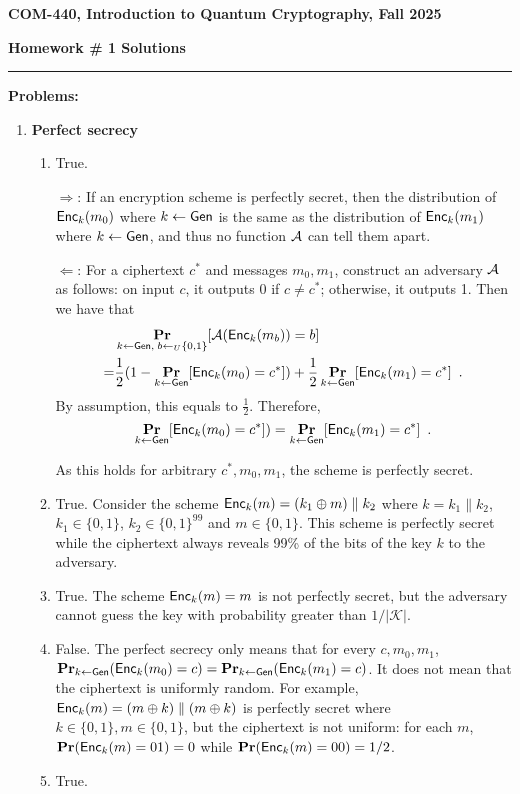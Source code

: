 \documentclass[12pt]{article}
\newcommand{\header}[1]{\begin{center} {\large\bf #1} \end{center}}
\begin{document}
\header{COM-440, Introduction to Quantum Cryptography, Fall 2025}
{\bf Homework \# 1 Solutions} 


\medskip

\hrule

 
\medskip
{\bf Problems:}

\begin{enumerate}

	
\item {\bf Perfect secrecy}
\begin{enumerate}
	\item True. 
	
	$\Rightarrow$: If an encryption scheme is perfectly secret, then the distribution of $\mathsf{Enc}_{k}(m_0)$ where $k \gets \mathsf{Gen}$ is the same as the distribution of $\mathsf{Enc}_{k}(m_1)$ where $k \gets \mathsf{Gen}$, and thus no function $\mathcal{A}$ can tell them apart.
	
	$\Leftarrow$: For a ciphertext $c^*$ and messages $m_0, m_1$, construct an adversary  $\mathcal{A}$ as follows: on input $c$, it outputs 0 if $c \ne c^*$; otherwise, it outputs 1. Then we have that
	\begin{align*}
	&\mathop{\bf Pr\/}_{k \gets \mathsf{Gen},\; b \gets_U \{0,1\}}[\mathcal{A}(\mathsf{Enc}_{k}(m_{b}))
    = b]\\
    =& \frac{1}{2}(1 - \mathop{\bf Pr\/}_{k \gets \mathsf{Gen}}[\mathsf{Enc}_{k}(m_{0}) = c^*]) + \frac{1}{2}\mathop{\bf Pr\/}_{k \gets \mathsf{Gen}}[\mathsf{Enc}_{k}(m_{1}) = c^*]\enspace.
	\end{align*}
	By assumption, this equals to $\frac{1}{2}$. Therefore,
	\[\mathop{\bf Pr\/}_{k \gets \mathsf{Gen}}[\mathsf{Enc}_{k}(m_{0}) = c^*]) = \mathop{\bf Pr\/}_{k \gets \mathsf{Gen}}[\mathsf{Enc}_{k}(m_{1}) = c^*]\enspace.\]
	
	As this holds for arbitrary $c^*, m_0, m_1$, the scheme is perfectly secret.
	\item True. Consider the scheme $\mathsf{Enc}_{k}(m) = (k_1 \oplus m) \parallel k_2$ where $k = k_1 \parallel k_2$, $k_1 \in \{0, 1\}$, $k_2 \in \{0, 1\}^{99}$ and $m \in \{0, 1\}$. This scheme is perfectly secret while the ciphertext always reveals 99\% of the bits of the key $k$ to the adversary.
	\item True. The scheme $\mathsf{Enc}_{k}(m) = m$ is not perfectly secret, but the adversary cannot guess the key with probability greater than $1/|\mathcal{K}|$.
	\item False. The perfect secrecy only means that for every $c, m_0, m_1$, $\mathop{\bf Pr\/}_{k \gets \mathsf{Gen}}(\mathsf{Enc}_{k}(m_0)= {c}) = \mathop{\bf Pr\/}_{k \gets \mathsf{Gen}}(\mathsf{Enc}_{k}(m_1)= {c})$. It does not mean that the ciphertext is uniformly random. For example, $\mathsf{Enc}_{k}(m) = (m \oplus k) \parallel (m \oplus k)$ is perfectly secret where $k \in \{0, 1\}, m \in \{0, 1\}$, but the ciphertext is not uniform: for each $m$, $\mathop{\bf Pr\/}(\mathsf{Enc}_{k}(m) = 01) = 0$ while $\mathop{\bf Pr\/}(\mathsf{Enc}_{k}(m) = 00) = 1/2$.
	\item True.
	

\end{enumerate}
\end{enumerate}
\end{document}
